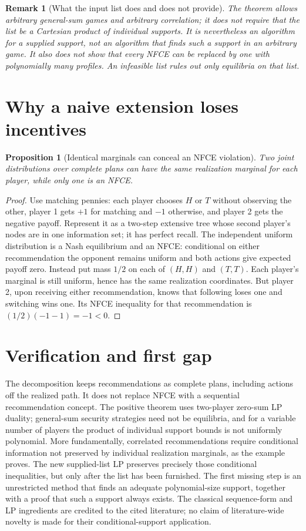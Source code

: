 \documentclass[11pt]{article}
\newtheorem{proposition}[theorem]{Proposition}
\newtheorem{remark}[theorem]{Remark}
\theoremstyle{definition}
\begin{document}
\begin{remark}[What the input list does and does not provide]
The theorem allows arbitrary general-sum games and arbitrary correlation;
it does not require that the list be a Cartesian product of individual
supports. It is nevertheless an algorithm for a supplied support, not an
algorithm that finds such a support in an arbitrary game. It also does not
show that every NFCE can be replaced by one with polynomially many profiles.
An infeasible list rules out only equilibria on that list.
\end{remark}

\section{Why a naive extension loses incentives}
\begin{proposition}[Identical marginals can conceal an NFCE violation]
Two joint distributions over complete plans can have the same realization
marginal for each player, while only one is an NFCE.
\end{proposition}
\begin{proof}
Use matching pennies: each player chooses $H$ or $T$ without observing the
other, player 1 gets $+1$ for matching and $-1$ otherwise, and player 2 gets
the negative payoff. Represent it as a two-step extensive tree whose second
player's nodes are in one information set; it has perfect recall.
The independent uniform distribution is a Nash equilibrium and an NFCE:
conditional on either recommendation the opponent remains uniform and both
actions give expected payoff zero. Instead put mass $1/2$ on each of
$(H,H)$ and $(T,T)$. Each player's marginal is still uniform, hence has the
same realization coordinates. But player 2, upon receiving either recommendation,
knows that following loses one and switching wins one. Its NFCE inequality
for that recommendation is $(1/2)(-1-1)=-1<0$.
\end{proof}

\section{Verification and first gap}
The decomposition keeps recommendations as complete plans, including actions
off the realized path. It does not replace NFCE with a sequential recommendation
concept. The positive theorem uses two-player zero-sum LP duality; general-sum
security strategies need not be equilibria, and for a variable number of
players the product of individual support bounds is not uniformly polynomial.
More fundamentally, correlated recommendations require conditional information
not preserved by individual realization marginals, as the example proves.
The new supplied-list LP preserves precisely those conditional inequalities,
but only after the list has been furnished. The first missing step is an
unrestricted method that finds an adequate polynomial-size support, together
with a proof that such a support always exists. The classical sequence-form
and LP ingredients are credited to the cited literature; no claim of
literature-wide novelty is made for their conditional-support application.
\end{document}
